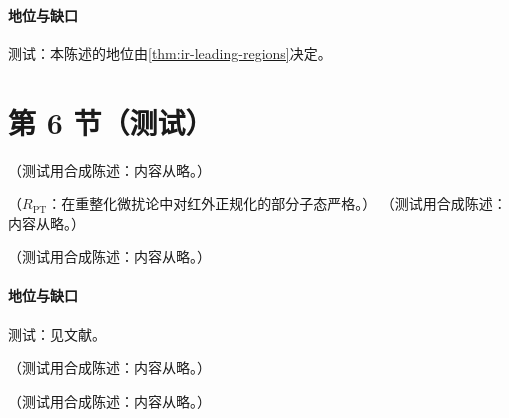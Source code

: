 \paragraph{地位与缺口}测试：本陈述的地位由\cref{thm:ir-leading-regions}决定。

\section{第 6 节（测试）}\label{sec:ir-cancellation}

\begin{definition}[区域方法]\label{def:ir-regions}
（测试用合成陈述：内容从略。）
\end{definition}

\begin{theorem}\label{thm:ir-regions-euclid}
（$R_{\mathrm{PT}}$：在重整化微扰论中对红外正规化的部分子态严格。）
（测试用合成陈述：内容从略。）
\end{theorem}

\begin{proposition}\label{prop:ir-regions-minkowski}
（测试用合成陈述：内容从略。）
\end{proposition}
\paragraph{地位与缺口}测试：见文献。

\begin{remark}[发散区域积分的值依赖于表示]\label{rem:ir-regions-values}
（测试用合成陈述：内容从略。）
\end{remark}

\begin{example}[一维玩具积分与零区减除]\label{ex:ir-regions-toy}
（测试用合成陈述：内容从略。）
\end{example}
